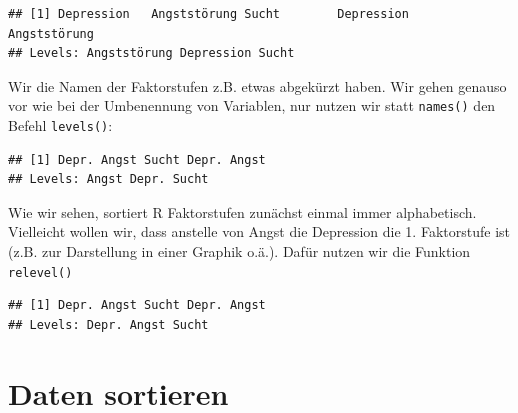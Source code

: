 \documentclass[
]{book}
\newenvironment{Shaded}{\begin{snugshade}}{\end{snugshade}}
\newcommand{\FunctionTok}[1]{\textcolor[rgb]{0.00,0.00,0.00}{#1}}
\newcommand{\NormalTok}[1]{#1}
\newcommand{\OtherTok}[1]{\textcolor[rgb]{0.56,0.35,0.01}{#1}}
\newcommand{\SpecialCharTok}[1]{\textcolor[rgb]{0.00,0.00,0.00}{#1}}
\newcommand{\StringTok}[1]{\textcolor[rgb]{0.31,0.60,0.02}{#1}}
\begin{document}
\begin{verbatim}
## [1] Depression   Angststörung Sucht        Depression   Angststörung
## Levels: Angststörung Depression Sucht
\end{verbatim}

Wir die Namen der Faktorstufen z.B. etwas abgekürzt haben. Wir gehen genauso vor wie bei der Umbenennung von Variablen, nur nutzen wir statt \texttt{names()} den Befehl \texttt{levels()}:

\begin{Shaded}
\end{Shaded}

\begin{verbatim}
## [1] Depr. Angst Sucht Depr. Angst
## Levels: Angst Depr. Sucht
\end{verbatim}

Wie wir sehen, sortiert R Faktorstufen zunächst einmal immer alphabetisch. Vielleicht wollen wir, dass anstelle von Angst die Depression die 1. Faktorstufe ist (z.B. zur Darstellung in einer Graphik o.ä.). Dafür nutzen wir die Funktion \texttt{relevel()}

\begin{Shaded}
\end{Shaded}

\begin{verbatim}
## [1] Depr. Angst Sucht Depr. Angst
## Levels: Depr. Angst Sucht
\end{verbatim}

\hypertarget{daten-sortieren}{%
\section{Daten sortieren}\label{daten-sortieren}}
\end{document}
